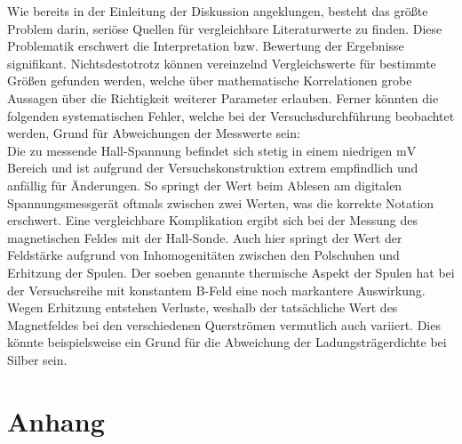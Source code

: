 \noindent Wie bereits in der Einleitung der Diskussion angeklungen, besteht das größte Problem darin, seriöse 
Quellen für vergleichbare Literaturwerte zu finden. Diese Problematik erschwert die Interpretation bzw. Bewertung 
der Ergebnisse signifikant. Nichtsdestotrotz können vereinzelnd Vergleichswerte für bestimmte Größen gefunden werden, 
welche über mathematische Korrelationen grobe Aussagen über die Richtigkeit weiterer Parameter erlauben. Ferner 
könnten die folgenden systematischen Fehler, welche bei der Versuchsdurchführung beobachtet werden, Grund für 
Abweichungen der Messwerte sein:\\

\noindent Die zu messende Hall-Spannung befindet sich stetig in einem niedrigen $\unit{\milli\volt}$ Bereich und ist 
aufgrund der Versuchskonstruktion extrem empfindlich und anfällig für Änderungen. So springt der Wert beim Ablesen am 
digitalen Spannungsmessgerät oftmals zwischen zwei Werten, was die korrekte Notation erschwert. Eine vergleichbare Komplikation 
ergibt sich bei der Messung des magnetischen Feldes mit der Hall-Sonde. Auch hier springt der Wert der Feldstärke 
aufgrund von Inhomogenitäten zwischen den Polschuhen und Erhitzung der Spulen. Der soeben genannte thermische Aspekt 
der Spulen hat bei der Versuchsreihe mit konstantem B-Feld eine noch markantere Auswirkung. Wegen Erhitzung entstehen 
Verluste, weshalb der tatsächliche Wert des Magnetfeldes bei den verschiedenen Querströmen vermutlich auch variiert.
Dies könnte beispielsweise ein Grund für die Abweichung der Ladungsträgerdichte bei Silber sein.  

\section{Anhang}

